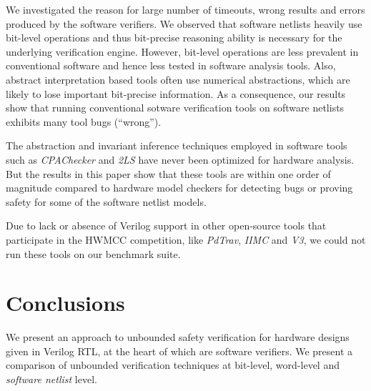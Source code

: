 We investigated the reason for large
number of timeouts, wrong results and errors produced by the software
verifiers.  We observed that software netlists heavily use bit-level 
operations and thus bit-precise reasoning ability is necessary for 
the underlying verification engine. However, bit-level operations 
are less prevalent in conventional software and hence less tested 
in software analysis tools. Also, abstract interpretation based tools 
often use numerical abstractions, which are likely to lose 
important bit-precise information.  As a consequence, 
our results show that running conventional sotware verification 
tools on software netlists exhibits many tool bugs (``wrong'').

The abstraction and invariant inference techniques employed in
software tools such as \emph{CPAChecker} and \emph{2LS} have never
been optimized for hardware analysis. But the results in this paper
show that these tools are within one order of magnitude compared to
hardware model checkers for detecting bugs or proving safety for some
of the software netlist models.  

Due to lack or absence of Verilog support in other open-source tools that
participate in the HWMCC competition, like \emph{PdTrav}, \emph{IIMC} and 
\emph{V3}, we could not run these tools on our benchmark suite. 


\section{Conclusions}
We present an approach to unbounded safety verification for hardware
designs given in Verilog RTL, at the heart of which are software
verifiers.  We present a comparison of unbounded verification
techniques at bit-level, word-level and \emph{software netlist} level.

